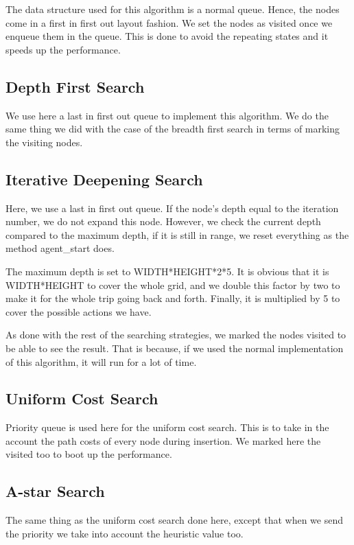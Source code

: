 The data structure used for this algorithm is a normal queue. Hence, the nodes come in a first in first out layout fashion. We set the nodes as visited once we enqueue them in the queue. This is done to avoid the repeating states and it speeds up the performance.

\subsection{Depth First Search}

We use here a last in first out queue to implement this algorithm. We do the same thing we did with the case of the breadth first search in terms of marking the visiting nodes.

\subsection{Iterative Deepening Search}

Here, we use a last in first out queue. If the node's depth equal to the iteration number, we do not expand this node. However, we check the current depth compared to the maximum depth, if it is still in range, we reset everything as the method agent\_start does.

The maximum depth is set to WIDTH*HEIGHT*2*5. It is obvious that it is
 WIDTH*HEIGHT to cover the whole grid, and we double this factor by two to make it for the whole trip going back and forth. Finally, it is multiplied by 5 to cover the possible actions we have.

As done with the rest of the searching strategies, we marked the nodes visited to be able to see the result. That is because, if we used the normal implementation of this algorithm, it will run for a lot of time.

\subsection{Uniform Cost Search}		

Priority queue is used here for the uniform cost search. This is to take in the account the path costs of every node during insertion. We marked here the visited too to boot up the performance.

\subsection{A-star Search}

The same thing as the uniform cost search done here, except that when we send the priority we take into account the heuristic value too.


